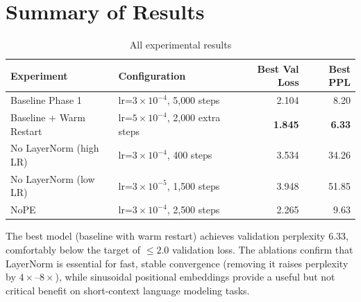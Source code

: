 \documentclass{article}
\begin{document}
\section{Summary of Results}

\begin{table}[h]
\centering
\caption{All experimental results}
\label{tab:summary}
\begin{tabular}{llrr}
\toprule
Experiment & Configuration & Best Val Loss & Best PPL \\
\midrule
Baseline Phase 1 & lr=$3\times10^{-4}$, 5{,}000 steps & 2.104 & 8.20 \\
Baseline + Warm Restart & lr=$5\times10^{-4}$, 2{,}000 extra steps & \textbf{1.845} & \textbf{6.33} \\
\midrule
No LayerNorm (high LR) & lr=$3\times10^{-4}$, 400 steps & 3.534 & 34.26 \\
No LayerNorm (low LR) & lr=$3\times10^{-5}$, 1{,}500 steps & 3.948 & 51.85 \\
\midrule
NoPE & lr=$3\times10^{-4}$, 2{,}500 steps & 2.265 & 9.63 \\
\bottomrule
\end{tabular}
\end{table}

The best model (baseline with warm restart) achieves validation perplexity
$6.33$, comfortably below the target of $\leq 2.0$ validation loss.  The
ablations confirm that LayerNorm is essential for fast, stable convergence
(removing it raises perplexity by $4\times$--$8\times$), while sinusoidal
positional embeddings provide a useful but not critical benefit on short-context
language modeling tasks.
\end{document}
